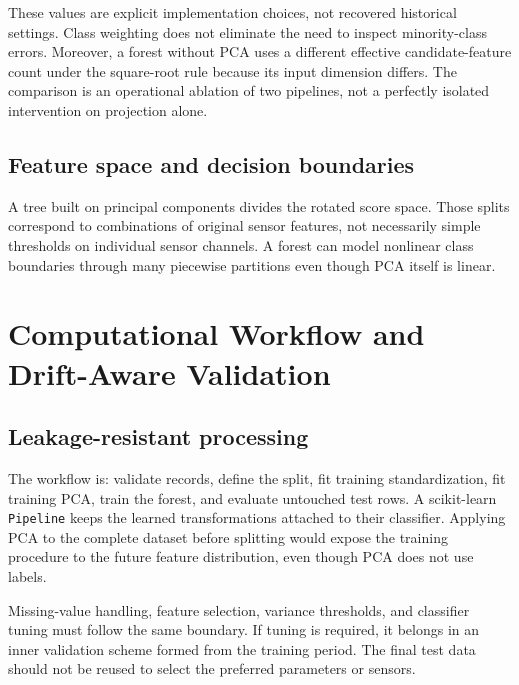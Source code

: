\documentclass[11pt,a4paper]{article}
\newcommand{\sectionpage}[1]{\clearpage\section{#1}}
\begin{document}
These values are explicit implementation choices, not recovered historical settings. Class weighting does not eliminate the need to inspect minority-class errors. Moreover, a forest without PCA uses a different effective candidate-feature count under the square-root rule because its input dimension differs. The comparison is an operational ablation of two pipelines, not a perfectly isolated intervention on projection alone.

\subsection{Feature space and decision boundaries}
A tree built on principal components divides the rotated score space. Those splits correspond to combinations of original sensor features, not necessarily simple thresholds on individual sensor channels. A forest can model nonlinear class boundaries through many piecewise partitions even though PCA itself is linear.

\sectionpage{Computational Workflow and Drift-Aware Validation}
\subsection{Leakage-resistant processing}
The workflow is: validate records, define the split, fit training standardization, fit training PCA, train the forest, and evaluate untouched test rows. A scikit-learn \texttt{Pipeline} keeps the learned transformations attached to their classifier. Applying PCA to the complete dataset before splitting would expose the training procedure to the future feature distribution, even though PCA does not use labels.

Missing-value handling, feature selection, variance thresholds, and classifier tuning must follow the same boundary. If tuning is required, it belongs in an inner validation scheme formed from the training period. The final test data should not be reused to select the preferred parameters or sensors.
\end{document}
